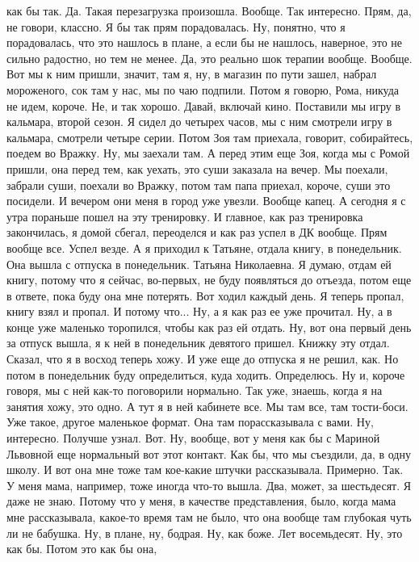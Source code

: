 как бы так. Да. Такая перезагрузка
произошла. Вообще. Так интересно.
Прям, да, не говори, классно.
Я бы так прям порадовалась. Ну, понятно,
что я порадовалась, что это нашлось в плане,
а если бы не нашлось, наверное, это не сильно радостно, но тем не менее.
Да, это реально шок терапии
вообще. Вообще.
Вот мы к ним пришли,
значит,
там я, ну, в магазин по пути зашел,
набрал мороженого, сок там у нас, мы по чаю подпили.
Потом я говорю, Рома, никуда
не идем, короче. Не, и так
хорошо. Давай, включай кино.
Поставили мы игру в кальмара,
второй сезон. Я сидел
до четырех часов, мы с ним смотрели
игру в кальмара, смотрели четыре серии.
Потом Зоя там приехала,
говорит, собирайтесь,
поедем во Вражку.
Ну, мы заехали там. А перед этим
еще Зоя, когда мы с Ромой
пришли, она перед тем, как уехать, это суши
заказала на вечер. Мы поехали,
забрали суши, поехали
во Вражку, потом там папа приехал,
короче, суши это посидели. И вечером
они меня в город уже
увезли.
Вообще капец.
А сегодня я с утра
пораньше пошел
на эту тренировку.
И главное, как раз тренировка закончилась,
я домой сбегал, переоделся и как раз
успел в ДК вообще. Прям вообще
все. Успел везде.
А я приходил к Татьяне,
отдала книгу,
в понедельник. Она вышла с отпуска
в понедельник. Татьяна Николаевна.
Я думаю, отдам ей книгу,
потому что я сейчас, во-первых, не буду
появляться до отъезда, потом еще
в ответе, пока буду она мне потерять.
Вот ходил каждый день.
Я теперь пропал, книгу взял и пропал.
И потому что...
Ну, а я как раз ее уже прочитал.
Ну, а в конце уже маленько торопился, чтобы
как раз ей отдать. Ну, вот она
первый день за отпуск вышла, я к ней в понедельник
девятого пришел.
Книжку эту отдал.
Сказал, что я в восход
теперь хожу. И
уже еще до отпуска я не решил,
как. Но потом
в понедельник буду определиться, куда
ходить. Определюсь.
Ну и, короче говоря, мы с ней как-то
поговорили нормально.
Так уже, знаешь, когда я на занятия хожу,
это одно. А тут я в ней кабинете
все. Мы там все, там
тости-боси. Уже
такое, другое маленькое формат.
Она там порассказывала с вами.
Ну, интересно.
Получше узнал.
Вот. Ну, вообще, вот у меня
как бы с Мариной Львовной
еще нормальный вот этот контакт.
Как бы, что мы съездили,
да, в одну школу.
И вот она мне тоже там кое-какие
штучки рассказывала.
Примерно.
Так.
У меня мама, например, тоже иногда что-то вышла.
Два, может, за шестьдесят. Я даже не знаю.
Потому что у меня, в качестве представления,
было, когда мама мне рассказывала,
какое-то время там не было, что она
вообще там глубокая чуть ли не бабушка.
Ну, в плане, ну, бодрая. Ну, как боже.
Лет восемьдесят. Ну, это как бы.
Потом это как бы она,
